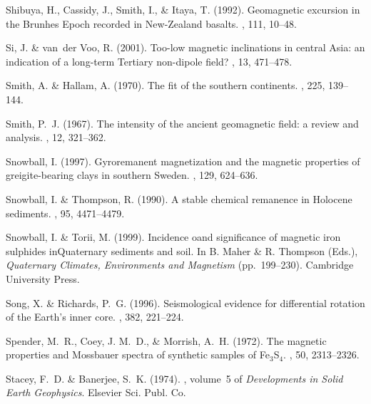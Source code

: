 \documentclass[11pt]{book}
\begin{document}
\begin{thebibliography}{}
Shibuya, H., Cassidy, J., Smith, I., \& Itaya, T. (1992).
\newblock Geomagnetic excursion in the Brunhes Epoch recorded in New-Zealand
  basalts.
, 111, 10--48.

Si, J. \& van~der Voo, R. (2001).
\newblock Too-low magnetic inclinations in central Asia: an indication of a
  long-term Tertiary non-dipole field?
, 13, 471--478.

Smith, A. \& Hallam, A. (1970).
\newblock The fit of the southern continents.
, 225, 139--144.

Smith, P.~J. (1967).
\newblock The intensity of the ancient geomagnetic field: a review and
  analysis.
, 12, 321--362.

Snowball, I. (1997).
\newblock Gyroremanent magnetization and the magnetic properties of
  greigite-bearing clays in southern Sweden.
, 129, 624--636.

Snowball, I. \& Thompson, R. (1990).
\newblock A stable chemical remanence in Holocene sediments.
, 95, 4471--4479.

Snowball, I. \& Torii, M. (1999).
\newblock Incidence oand significance of magnetic iron sulphides inQuaternary
  sediments and soil.
\newblock In B. Maher \& R. Thompson (Eds.), {\em Quaternary Climates,
  Environments and Magnetism}  (pp.\ 199--230). Cambridge University Press.

Song, X. \& Richards, P.~G. (1996).
\newblock Seismological evidence for differential rotation of the Earth's inner
  core.
, 382, 221--224.

Spender, M.~R., Coey, J. M.~D., \& Morrish, A.~H. (1972).
\newblock The magnetic properties and Mossbauer spectra of synthetic samples of
  Fe$_3$S$_4$.
, 50, 2313--2326.

Stacey, F.~D. \& Banerjee, S.~K. (1974).
, volume~5 of {\em
  Developments in Solid Earth Geophysics}.
\newblock Elsevier Sci. Publ. Co.


\end{thebibliography}
\end{document}
